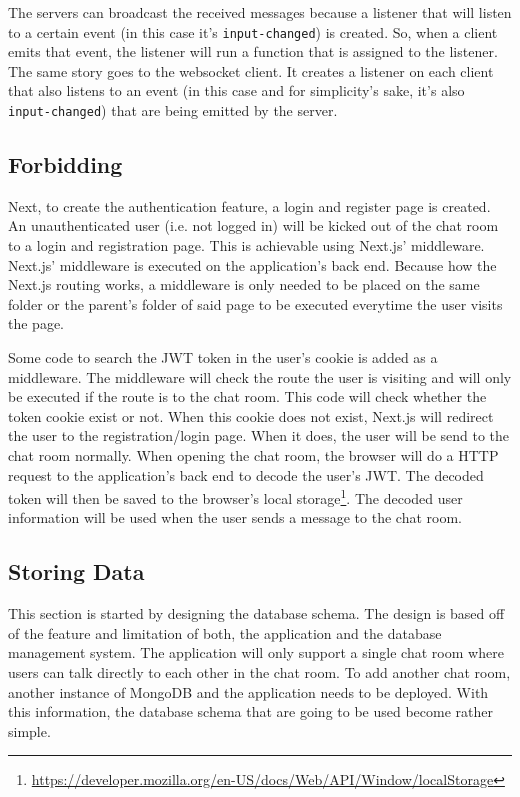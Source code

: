 \documentclass[conference]{IEEEtran}
\begin{document}
The servers can broadcast the received messages because a listener that will listen to a
certain event (in this case it's \texttt{input-changed}) is created. So, when a client
emits that event, the listener will run a function that is assigned to the listener.
The same story goes to the websocket client. It creates a listener on each client that
also listens to an event (in this case and for simplicity's sake, it's also
\texttt{input-changed}) that are being emitted by the server.

\subsection{Forbidding}

Next, to create the authentication feature, a login and register page is created.
An unauthenticated user (i.e. not logged in) will be kicked out of the chat room to
a login and registration page. This is achievable using Next.js' middleware. Next.js'
middleware is executed on the application's back end. Because how the Next.js routing
works, a middleware is only needed to be placed on the same folder or the parent's
folder of said page to be executed everytime the user visits the page.

Some code to search the JWT token in the user's cookie is added as a middleware.
The middleware will check the route the user is visiting and will only be executed if
the route is to the chat room. This code will check whether the token cookie exist or
not. When this cookie does not exist, Next.js will redirect the user to the
registration/login page. When it does, the user will be send to the chat room normally.
When opening the chat room, the browser will do a HTTP request to the application's
back end to decode the user's JWT. The decoded token will then be saved to the browser's
local storage\footnote{\url{https://developer.mozilla.org/en-US/docs/Web/API/Window/localStorage}}.
The decoded user information will be used when the user sends a message to the chat
room.

\subsection{Storing Data}

This section is started by designing the database schema. The design is based off of
the feature and limitation of both, the application and the database management system.
The application will only support a single chat room where users can talk directly to
each other in the chat room. To add another chat room, another instance of MongoDB and
the application needs to be deployed. With this information, the database schema that
are going to be used become rather simple.
\end{document}
